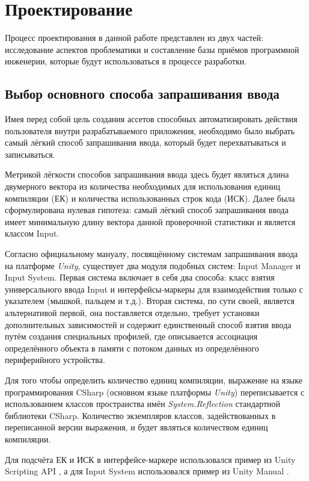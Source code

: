 \chapter{Проектирование}
\label{cha:ch_1}

Процесс проектирования в данной работе представлен из двух частей: исследование аспектов проблематики и составление базы приёмов программной инженерии, которые будут использоваться в процессе разработки.

\section{Выбор основного способа запрашивания ввода}
Имея перед собой цель создания ассетов способных автоматизировать действия пользователя внутри разрабатываемого приложения, необходимо было выбрать самый лёгкий способ запрашивания ввода, который будет перехватываться и записываться.

Метрикой лёгкости способов запрашивания ввода здесь будет являться длина двумерного вектора из количества необходимых для использования единиц компиляции (ЕК) и количества использованных строк кода (ИСК). Далее была сформулирована нулевая гипотеза: самый лёгкий способ запрашивания ввода имеет минимальную длину вектора данной проверочной статистики и является классом Input.

Согласно официальному мануалу, посвящённому системам запрашивания ввода \cite{unity_input_systems} на платформе \textit{Unity}, существует два модуля подобных систем: Input Manager и Input System. Первая система включает в себя два способа: класс взятия универсального ввода Input и интерфейсы-маркеры для взаимодействия только с указателем (мышкой, пальцем и т.д.). Вторая система, по сути своей, является альтернативой первой, она поставляется отдельно, требует установки дополнительных зависимостей и содержит единственный способ взятия ввода путём создания специальных профилей, где описывается ассоциация определённого объекта в памяти с потоком данных из определённого периферийного устройства.

Для того чтобы определить количество единиц компиляции, выражение на языке программирования CSharp (основном языке платформы \textit{Unity}) переписывается с использованием классов пространства имён \textit{System.Reflection} стандартной библиотеки CSharp. Количество экземпляров классов, задействованных в переписанной версии выражения, и будет являться количеством единиц компиляции.

Для подсчёта ЕК и ИСК в интерфейсе-маркере использовался пример из Unity Scripting API \cite{unity_interface}, а для Input System использовался пример из Unity Manual \cite{unity_is}.

